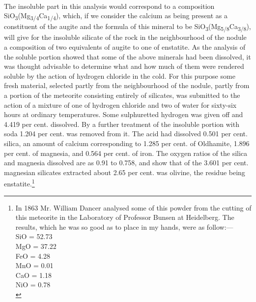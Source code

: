 \documentclass[a4paper, 12pt, oneside]{article}
\begin{document}
\paragraph{}
The insoluble part in this analysis would correspond to a composition SiO\textsubscript{3}(Mg\textsubscript{3/4}Ca\textsubscript{1/4}), which, if we consider the calcium as being present as a constituent of the augite and the formula of this mineral to be SiO\textsubscript{3}(Mg\textsubscript{5/8}Ca\textsubscript{3/8}), will give for the insoluble silicate of the rock in the neighbourhood of the nodule a composition of two equivalents of augite to one of enstatite. As the analysis of the soluble portion showed that some of the above minerals had been dissolved, it was thought advisable to determine what and how much of them were rendered soluble by the action of hydrogen chloride in the cold. For this purpose some fresh material, selected partly from the neighbourhood of the nodule, partly from a portion of the meteorite consisting entirely of silicates, was submitted to the action of a mixture of one of hydrogen chloride and two of water for sixty-six hours at ordinary temperatures. Some sulphuretted hydrogen was given off and 4.419 per cent. dissolved. By a further treatment of the insoluble portion with soda 1.204 per cent. was removed from it. The acid had dissolved 0.501 per cent. silica, an amount of calcium corresponding to 1.285 per cent. of Oldhamite, 1.896 per cent. of magnesia, and 0.564 per cent. of iron. The oxygen ratios of the silica and magnesia dissolved are as 0.91 to 0.758, and show that of the 3.601 per cent. magnesian silicates extracted about 2.65 per cent. was olivine, the residue being enstatite.\footnote{In 1863 Mr. William Dancer analysed some of this powder from the cutting of this meteorite in the Laboratory of Professor Bunsen at Heidelberg.  
The results, which he was so good as to place in my hands, were as follow:---\\
\hspace*{20mm}SiO = 52.73\\
\hspace*{20mm}MgO = 37.22\\
\hspace*{20mm}FeO = 4.28\\
\hspace*{20mm}MnO = 0.01\\
\hspace*{20mm}CaO = 1.18\\
\hspace*{20mm}NiO = 0.78\\
}
\end{document}
